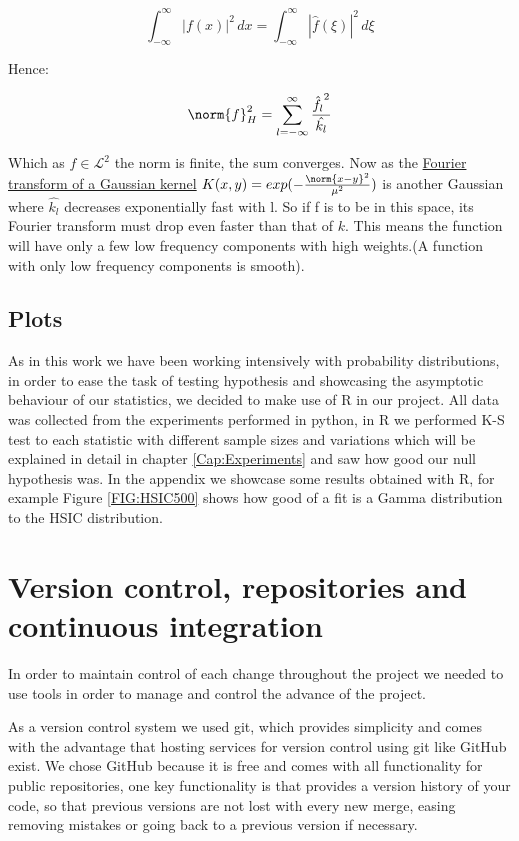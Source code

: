 $$
\int _{-\infty }^{\infty }|f(x)|^{2}\,dx=\int _{-\infty }^{\infty }|{\widehat {f}}(\xi )|^{2}\,d\xi
$$

Hence:

$$
\norm{f}^{2}_{H}= \sum_{l=-\infty}^{\infty}\frac{\hat{f_{l}}^{2}}{\hat{k_{l}}}
$$

Which as $f\in\mathcal{L}^{2}$ the norm is finite, the sum converges. Now as the  \href{http://mathworld.wolfram.com/FourierTransformGaussian.html}{Fourier transform of a Gaussian kernel}  $K(x,y) = exp(-\frac{\norm{x-y}^{2}}{\mu^{2}})$ is another Gaussian where $\hat{k_{l}}$ decreases exponentially fast with l. So if f is to be in this space, its Fourier transform must drop even faster than that of $k$. This means the function will have only a few low frequency components with high weights.(A function with only low frequency components is smooth). 


\label{Plots}\subsection{Plots} 


As in this work we have been working intensively with probability distributions, in order to ease the task of testing hypothesis and showcasing the asymptotic behaviour of our statistics, we decided to make use of R in our project. All data was collected from the experiments performed in python, in R we performed K-S test to each statistic with different sample sizes and variations which will be explained in detail in chapter \ref{Cap:Experiments} and saw how good our null hypothesis was. In the appendix we showcase some results obtained with R, for example Figure \ref{FIG:HSIC500} shows how good of a fit is a Gamma distribution to the HSIC distribution.

\section{Version control, repositories and continuous integration}
\FloatBarrier
In order to maintain control of each change throughout the project we needed to use tools in order to manage and control the advance of the project.

As a version control system we used git, which provides simplicity and comes with the advantage that hosting services for version control using git like GitHub exist. We chose GitHub because it is free and comes with all functionality for public repositories, one key functionality is that provides a version history of your code, so that previous versions are not lost with every new merge, easing removing mistakes or going back to a previous version if necessary. 

